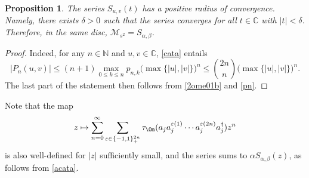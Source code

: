 \documentclass[12pt]{amsart}
\numberwithin{equation}{section}
\def\cam{{\mathcal M}}
\def\bc{{\mathbb C}}
\def\bn{{\mathbb N}}
\def\a{\alpha}
\def\b{\beta}
\def\eps{\varepsilon}
\def\t{\tau}
\newtheorem{prop}[thm]{Proposition}
\theoremstyle{definition}
\begin{document}
\begin{prop}\label{2ome03}
The series $S_{u,v}(t)$ has a positive radius of convergence. Namely, there exists $\delta>0$ such that the series converges for all $t\in\bc$ with $|t|<\delta$. Therefore, in the same disc, $\cam_{s^2}=S_{\a,\b}$.
\end{prop}

\begin{proof}
Indeed, for any $n\in\bn$ and $u,v\in\bc$, \eqref{cata} entails
\[
|P_n(u,v)| \le (n+1) \max_{0\le k\le n} p_{n,k} \big(\max\{|u|,|v|\}\big)^n \le \binom{2n}{n} \big(\max\{|u|,|v|\}\big)^n.
\]
The last part of the statement then follows from \eqref{2ome01b} and \eqref{pn}.
\end{proof}

Note that the map
\[
z \mapsto \sum_{n=0}^\infty \sum_{\eps\in \{-1,1\}^{2n}_+} \t_\Om(a_j a_j^{\eps(1)} \cdots a_j^{\eps(2n)} a_j^\dag)  z^n
\]
is also well-defined for $|z|$ sufficiently small, and the series sums to $\a S_{\a,\b}(z)$, as follows from \eqref{acata}.
\end{document}
